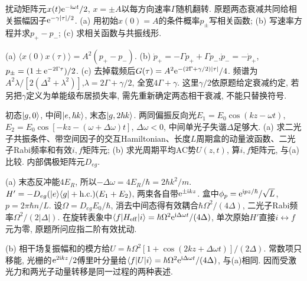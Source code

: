 \begin{exercise}扰动矩阵元$x(t)\mathrm e^{-\mathrm i\omega t}/2$, $x=\pm A$以每方向速率$\Gamma$随机翻转. 原题两态衰减共同给相关振幅因子$\mathrm e^{-\gamma|\tau|/2}$. (a) 用初始$x(0)=A$的条件概率$p_\pm$写相关函数; (b) 写速率方程并求$p_+-p_-$; (c) 求相关函数与共振线形.\end{exercise}
\begin{solution}(a) $\langle x(0)x(\tau)\rangle=A^2(p_+-p_-)$. (b) $\dot p_+=-\Gamma p_++\Gamma p_-$,$\dot p_-=-\dot p_+$,$p_\pm=(1\pm\mathrm e^{-2\Gamma\tau})/2$. (c) 去掉载频后$G(\tau)=A^2\mathrm e^{-(2\Gamma+\gamma/2)|\tau|}/4$. 频谱为$A^2\lambda/[2(\Delta^2+\lambda^2)]$,$\lambda=2\Gamma+\gamma/2$, 全宽$4\Gamma+\gamma$. 这里$\gamma/2$依原题给定衰减约定, 若另把$\gamma$定义为单能级布居损失率, 需先重新确定两态相干衰减, 不能只替换符号.
\end{solution}
\begin{exercise}初态$\lvert g,0\rangle$, 中间$\lvert e,\hbar k\rangle$, 末态$\lvert g,2\hbar k\rangle$. 两同偏振反向光$E_1=E_0\cos(kz-\omega t)$,$E_2=E_0\cos[-kz-(\omega+\Delta\omega)t]$, $\Delta\omega<0$, 中间单光子失谐$\Delta$足够大. (a) 求二光子共振条件、带空间因子的交互Hamiltonian、长度$L$周期盒的动量波函数、二光子Rabi频率和有效$i,f$矩阵元; (b) 求光周期平均AC势$U(z,t)$, 算$i,f$矩阵元, 与(a)比较. 内部偶极矩阵元$D_{eg}$.\end{exercise}
\begin{solution}(a) 末态反冲能$4E_R$, 所以$-\Delta\omega=4E_R/\hbar=2\hbar k^2/m$. $H'=-D_{eg}(\lvert e\rangle\langle g\rvert+\mathrm{h.c.})(E_1+E_2)$, 两束各自带$\mathrm e^{\pm\mathrm i kz}$. 盒中$\phi_p=\mathrm e^{\mathrm i pz/\hbar}/\sqrt L$, $p=2\pi\hbar n/L$. 设$\Omega=D_{eg}E_0/\hbar$, 消去中间态得有效耦合$\hbar\Omega^2/(4\Delta)$, 二光子Rabi频率$\Omega^2/(2|\Delta|)$. 在旋转表象中$\langle f\rvert H_{\rm eff}\lvert i\rangle=\hbar\Omega^2\mathrm e^{\mathrm i\Delta\omega t}/(4\Delta)$, 单次原始$H'$直接$i\leftrightarrow f$元为零, 原题所问应指二阶有效扰动.

(b) 相干场复振幅和的模方给$U=\hbar\Omega^2[1+\cos(2kz+\Delta\omega t)]/(2\Delta)$. 常数项只移能, 光栅的$\mathrm e^{2\mathrm i kz}/2$傅里叶分量给$\langle f\rvert U\lvert i\rangle=\hbar\Omega^2\mathrm e^{\mathrm i\Delta\omega t}/(4\Delta)$, 与(a)相同. 因而受激光力和两光子动量转移是同一过程的两种表述.
\end{solution}

